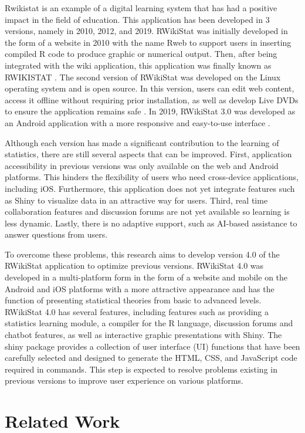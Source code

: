 \documentclass[conference,a4paper]{IEEEtran}
\begin{document}
Rwikistat is an example of a digital learning system that has had a positive
impact in the field of education. This application has been developed in 3
versions, namely in 2010, 2012, and 2019. RWikiStat was initially developed in
the form of a website in 2010 with the name Rweb to support users in inserting
compiled R code to produce graphic or numerical output. Then, after being
integrated with the wiki application, this application was finally known as
RWIKISTAT \cite{b3}. The second version of RWikiStat was developed on the Linux
operating system and is open source. In this version, users can edit web
content, access it offline without requiring prior installation, as well as
develop Live DVDs to ensure the application remains safe \cite{b4}. In 2019,
RWikiStat 3.0 was developed as an Android application with a more responsive
and easy-to-use interface \cite{b5}.

Although each version has made a significant contribution to the learning of
statistics, there are still several aspects that can be improved. First,
application accessibility in previous versions was only available on the web
and Android platforms. This hinders the flexibility of users who need
cross-device applications, including iOS. Furthermore, this application does
not yet integrate features such as Shiny to visualize data in an attractive way
for users. Third, real time collaboration features and discussion forums are
not yet available so learning is less dynamic. Lastly, there is no adaptive
support, such as AI-based assistance to answer questions from users.

To overcome these problems, this research aims to develop version 4.0 of the
RWikiStat application to optimize previous versions. RWikiStat 4.0 was
developed in a multi-platform form in the form of a website and mobile on the
Android and iOS platforms with a more attractive appearance and has the
function of presenting statistical theories from basic to advanced levels.
RWikiStat 4.0 has several features, including features such as providing a
statistics learning module, a compiler for the R language, discussion forums
and chatbot features, as well as interactive graphic presentations with Shiny.
The shiny package provides a collection of user interface (UI) functions that
have been carefully selected and designed to generate the HTML, CSS, and
JavaScript code required in commands. This step is expected to resolve problems
existing in previous versions to improve user experience on various platforms.

\section{Related Work}
\label{sect:related_work}
\end{document}
